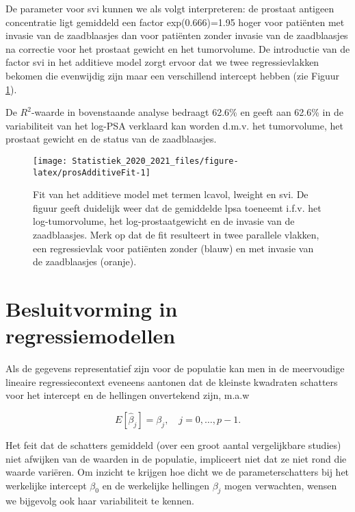 \documentclass[
  12pt,dutch,coursenotes]{book}
\theoremstyle{definition}
\theoremstyle{definition}
\theoremstyle{definition}
\theoremstyle{remark}
\begin{document}
De parameter voor svi kunnen we als volgt interpreteren: de prostaat antigeen concentratie ligt gemiddeld een factor exp(0.666)=1.95 hoger voor patiënten met invasie van de zaadblaasjes dan voor patiënten zonder invasie van de zaadblaasjes na correctie voor het prostaat gewicht en het tumorvolume. De introductie van de factor svi in het additieve model zorgt ervoor dat we twee regressievlakken bekomen die evenwijdig zijn maar een verschillend intercept hebben (zie Figuur \ref{fig:prosAdditiveFit}).

De \(R^2\)-waarde in bovenstaande analyse bedraagt 62.6\% en geeft aan 62.6\% in de variabiliteit van het log-PSA verklaard kan worden d.m.v. het tumorvolume, het prostaat gewicht en de status van de zaadblaasjes.

\begin{figure}

{\centering \texttt{[image: Statistiek\_2020\_2021\_files/figure-latex/prosAdditiveFit-1]} 

}

\caption{Fit van het additieve model met termen lcavol, lweight en svi. De figuur geeft duidelijk weer dat de gemiddelde lpsa toeneemt i.f.v. het log-tumorvolume, het log-prostaatgewicht en de invasie van de zaadblaasjes. Merk op dat de fit resulteert in twee parallele vlakken, een regressievlak voor patiënten zonder (blauw) en met invasie van de zaadblaasjes (oranje).}\label{fig:prosAdditiveFit}
\end{figure}

\hypertarget{besluitvorming-in-regressiemodellen}{%
\section{Besluitvorming in regressiemodellen}\label{besluitvorming-in-regressiemodellen}}

Als de gegevens representatief zijn voor de populatie kan men in de meervoudige lineaire regressiecontext eveneens aantonen dat de kleinste kwadraten schatters voor het intercept en de hellingen onvertekend zijn, m.a.w

\[E[\hat \beta_j]=\beta_j,\quad j=0,\ldots,p-1.\]

Het feit dat de schatters gemiddeld (over een groot aantal vergelijkbare studies) niet afwijken van de waarden in de populatie, impliceert niet dat ze niet rond die waarde variëren.
Om inzicht te krijgen hoe dicht we de parameterschatters bij het werkelijke intercept \(\beta_0\) en de werkelijke hellingen \(\beta_j\) mogen verwachten, wensen we bijgevolg ook haar variabiliteit te kennen.
\end{document}
